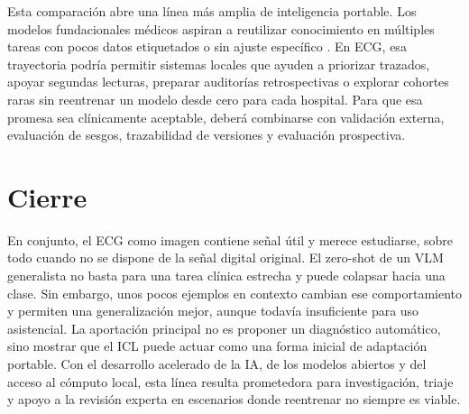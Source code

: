 Esta comparación abre una línea más amplia de inteligencia portable. Los modelos fundacionales médicos aspiran a reutilizar conocimiento en múltiples tareas con pocos datos etiquetados o sin ajuste específico \cite{moor2023gmai}. En ECG, esa trayectoria podría permitir sistemas locales que ayuden a priorizar trazados, apoyar segundas lecturas, preparar auditorías retrospectivas o explorar cohortes raras sin reentrenar un modelo desde cero para cada hospital. Para que esa promesa sea clínicamente aceptable, deberá combinarse con validación externa, evaluación de sesgos, trazabilidad de versiones y evaluación prospectiva.

\section{Cierre}

En conjunto, el ECG como imagen contiene señal útil y merece estudiarse, sobre todo cuando no se dispone de la señal digital original. El zero-shot de un VLM generalista no basta para una tarea clínica estrecha y puede colapsar hacia una clase. Sin embargo, unos pocos ejemplos en contexto cambian ese comportamiento y permiten una generalización mejor, aunque todavía insuficiente para uso asistencial. La aportación principal no es proponer un diagnóstico automático, sino mostrar que el ICL puede actuar como una forma inicial de adaptación portable. Con el desarrollo acelerado de la IA, de los modelos abiertos y del acceso al cómputo local, esta línea resulta prometedora para investigación, triaje y apoyo a la revisión experta en escenarios donde reentrenar no siempre es viable.
